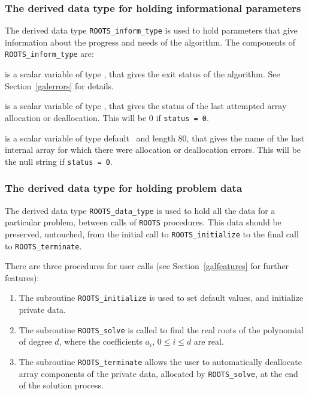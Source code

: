 \documentclass{galahad}
\newcommand{\packagename}{ROOTS}
\begin{document}

\subsubsection{The derived data type for holding informational
 parameters}\label{typeinform}
The derived data type 
{\tt \packagename\_inform\_type} 
is used to hold parameters that give information about the progress and needs 
of the algorithm. The components of 
{\tt \packagename\_inform\_type} 
are:

\begin{description}

 is a scalar variable of type \integer, that gives the
exit status of the algorithm. 
See Section~\ref{galerrors} 
for details.

 is a scalar variable of type \integer, that gives
the status of the last attempted array allocation or deallocation.
This will be 0 if {\tt status = 0}.

 is a scalar variable of type default \character\
and length 80, that  gives the name of the last internal array 
for which there were allocation or deallocation errors.
This will be the null string if {\tt status = 0}. 

\end{description}


\subsubsection{The derived data type for holding problem data}\label{typedata}
The derived data type 
{\tt \packagename\_data\_type} 
is used to hold all the data for a particular problem,
between calls of 
{\tt \packagename} procedures. 
This data should be preserved, untouched, from the initial call to 
{\tt \packagename\_initialize}
to the final call to
{\tt \packagename\_terminate}.


\galarguments
There are three procedures for user calls
(see Section~\ref{galfeatures} for further features): 
\begin{enumerate}
\item The subroutine 
      {\tt \packagename\_initialize} 
      is used to set default values, and initialize private data.
\item The subroutine 
      {\tt \packagename\_solve} 
      is called to find the real roots of the polynomial 
      of degree $d$, where the coefficients $a_i$, $0 \leq i \leq d$ are real.
\item The subroutine 
      {\tt \packagename\_terminate} 
      allows the user to automatically deallocate array 
       components of the private data, allocated by 
       {\tt \packagename\_solve}, 
       at the end of the solution process. 
\end{enumerate}
\end{document}
